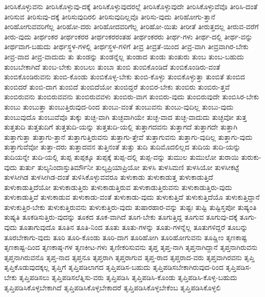 {ತೀರಿಸಿಕೊಳ್ಳುವನು
ತೀರಿಸಿಕೊಳ್ಳುವು-ದಕ್ಕೆ
ತೀರಿಸಿಕೊಳ್ಳುವುದರಲ್ಲೆ
ತೀರಿಸಿಕೊಳ್ಳುವುದೇ
ತೀರಿಸಿಕೊಳ್ಳುವೆವೊ
ತೀರಿಸಿ-ದಂತೆ
ತೀರಿಸುವ
ತೀರಿಸುವು-ದಕ್ಕೆ
ತೀರಿಸುವುದಿರಲಿ
ತೀರಿಸುವುದಿಲ್ಲವೊ
ತೀರಿಸು-ವುದು
ತೀರಿಹೋಗು-ತ್ತಾನೆ
ತೀರಿಹೋಗುವವರಿಗೆಲ್ಲ
ತೀರಿಹೋ-ದರು
ತೀರಿಹೋದವರಿಗೆಲ್ಲ
ತೀರಿಹೋ-ಯಿತು
ತೀರೀತೆ
ತೀರುತ್ತದಲ್ಲ
ತೀರುವ-ವರೆಗೆ
ತೀರು-ವುದು
ತೀರ್ಥಂಕರ
ತೀರ್ಥಂಕರರ
ತೀರ್ಥಂಕರರಂತಹ
ತೀರ್ಥಂಕರರು
ತೀರ್ಥ-ಗಳು
ತೀರ್ಥ-ದಲ್ಲಿ
ತೀರ್ಥ-ವನ್ನು
ತೀರ್ಥವಾಗ-ಬಹುದು
ತೀರ್ಥಸ್ಥಳ-ಗಳಲ್ಲಿ
ತೀರ್ಥಸ್ಥಳ-ಗಳಿಗೆ
ತೀವ್ರ
ತೀವ್ರತೆ-ಯಿಂದ
ತೀವ್ರ-ವಾಗಿ
ತೀವ್ರವಾಗಿರ-ಬೇಕು
ತೀವ್ರ-ವಾದ
ತೀವ್ರ-ವಾದುದು
ತು
ತುಂಡನ್ನು
ತುಂಡನ್ನೆಲ್ಲ
ತುಂಡಾದ
ತುಂಡು
ತುಂತುರು
ತುಂಬ
ತುಂಬ-ಬಹುದು
ತುಂಬಬೇಕಾಗಿದೆ
ತುಂಬ-ಬೇಕು
ತುಂಬಲು
ತುಂಬಾ
ತುಂಬಿ
ತುಂಬಿಕೊಂಡಿದೆ
ತುಂಬಿಕೊಂಡಿರು-ವಂತೆ
ತುಂಬಿಕೊಂಡಿರುವನು
ತುಂಬಿ-ಕೊಂಡು
ತುಂಬಿಕೊಳ್ಳ-ಬೇಕು
ತುಂಬಿ-ಕೊಳ್ಳು
ತುಂಬಿಕೊಳ್ಳುತ್ತಾ
ತುಂಬಿತೆ
ತುಂಬಿದ
ತುಂಬಿದರೆ
ತುಂಬಿ-ದಾಗ
ತುಂಬಿದೆ
ತುಂಬಿದೆಯೋ
ತುಂಬಿದ್ದರೆ
ತುಂಬಿರ-ಬೇಕು
ತುಂಬಿರು
ತುಂಬಿರು-ತ್ತವೆ
ತುಂಬಿರುವನು
ತುಂಬಿರುವವನು
ತುಂಬಿರುವವಳು
ತುಂಬಿರು-ವಾಗ
ತುಂಬಿರು-ವುದು
ತುಂಬಿರುವುದೇ
ತುಂಬಿಸಿರ-ಬೇಕು
ತುಂಬು
ತುಂಬುತ್ತಾ
ತುಂಬುತ್ತಿರುವುದ-ರಿಂದ
ತುಂಬು-ವಂತೆ
ತುಂಬುವನು
ತುಂಬು-ವುದಿಲ್ಲ
ತುಂಬು-ವುದು
ತುಂಬುವುದೊ
ತುಂಬುವೆವೊ
ತುಕ್ಕು
ತುಚ್ಛ-ವಾಗಿ
ತುಚ್ಛವಾಗಿಯೇ
ತುಚ್ಛ-ವಾದ
ತುಚ್ಛ-ವಾದುದು
ತುಚ್ಛವೋ
ತುತ್ತ
ತುತ್ತತುದಿ
ತುತ್ತತುದಿಗೆ
ತುತ್ತತುದಿ-ಯನ್ನು
ತುತ್ತತುದಿ-ಯಲ್ಲಿ
ತುತ್ತಾಗದವನು
ತುತ್ತಾಗದೆ
ತುತ್ತಾಗದೇ
ತುತ್ತಾಗಿ
ತುತ್ತಾಗುತ್ತಾ
ತುತ್ತಾಗು-ತ್ತಾನೆ
ತುತ್ತಾಗುತ್ತಿರುವನು
ತುತ್ತಾಗು-ತ್ತೇವೆ
ತುತ್ತಾಗುವನು
ತುತ್ತಾಗು-ವುದಿಲ್ಲ
ತುತ್ತಾಗು-ವುದು
ತುತ್ತಾಗುವೆವೋ
ತುತ್ತಾ-ದರು
ತುತ್ತಾದವನ
ತುತ್ತಿನಂತೆ
ತುತ್ತು
ತುದಿ
ತುದಿಮೊದಲಿಲ್ಲದ
ತುದಿಯ
ತುದಿ-ಯನ್ನು
ತುದಿಯನ್ನೇ
ತುದಿ-ಯಲ್ಲಿ
ತುಪ್ಪ
ತುಪ್ಪಕ್ಕೂ
ತುಪ್ಪಕ್ಕೆ
ತುಪ್ಪ-ದಲ್ಲಿ
ತುಪ್ಪ-ವನ್ನು
ತುಮುಲ
ತುಮುಲೋ
ತುರಾಯಿ
ತುರುಕು-ವುದು
ತುರ್ತು
ತುಲ್ಯನಿಂದಾಸ್ತುತಿರ್ಮೌನೀ
ತುಲ್ಯಪ್ರಿಯಾಪ್ರಿಯೋ
ತುಳಸಿ
ತುಳಸಿಮಣಿ
ತುಳಸಿಯೋ
ತುಳಸೀಕಟ್ಟೆ
ತುಳಸೀಗಿಡ
ತುಳಸೀಗಿಡ-ದಂತೆ
ತುಳಿಸಿಕೊಳ್ಳುವವರೂ
ತುಳುಕಾಡು
ತುಳುಕಾಡುತ್ತ
ತುಳುಕಾಡುತ್ತಿದೆ
ತುಳುಕಾಡುತ್ತಿದೆಯೋ
ತುಳುಕಾಡುತ್ತಿರು
ತುಳುಕಾಡುತ್ತಿರುವ
ತುಳುಕಾಡುತ್ತಿರುವನು
ತುಳುಕಾಡುತ್ತಿರು-ವುದು
ತುಳುಕಾಡುತ್ತಿವೆ
ತುಳುಕಾಡುವ
ತುಳುಕಾಡು-ವಂತೆ
ತುಳುಕಾಡು-ವುದು
ತುಳುಕುತ್ತಿದೆ
ತುಳುಕುತ್ತಿದೆಯೊ
ತುಳುಕುತ್ತಿದ್ದಾನೆ
ತುಳುಕುತ್ತಿರ-ಬೇಕು
ತುಳುಕುತ್ತಿರುವನು
ತುಳುಕುತ್ತಿರು-ವುದು
ತುಷಾರಹಾರ-ವನ್ನು
ತುಷ್ಟಃ
ತುಷ್ಟಿ
ತುಷ್ಟಿಸ್ತಪೋ
ತುಷ್ಯಂತಿ
ತುಷ್ಯತಿ
ತೂಕಡಿಸುತ್ತಿರು-ವುದನ್ನು
ತೂಕದ
ತೂಕ-ವಾಗಿದೆ
ತೂಗ-ಬೇಕು
ತೂಗುತ್ತಿದ್ದ
ತೂಗುವ
ತೂಗುವು-ದಕ್ಕೆ
ತೂಗು-ವುದು
ತೂತಾಗುವುದೊ
ತೂತಿನ
ತೂತಿ-ನಿಂದ
ತೂತು
ತೂತು-ಗಳನ್ನು
ತೂತು-ಗಳನ್ನೆಲ್ಲ
ತೂತುಗಳಿದ್ದರೆ
ತೂಬನ್ನು
ತೂರಬೇಕಾಗು-ವುದು
ತೂರಿ
ತೂರಿ-ಕೊಂಡು
ತೂರಿ-ದಾಗ
ತೂರಿಹೋಗಿ
ತೂರಿಹೋಗುವನು
ತೂಷ್ಣೀಂ
ತೃಣಕಾಷ್ಟ
ತೃಣಕಾಷ್ಟ-ದಿಂದ
ತೃಣಕಾಷ್ಠ-ಗಳ
ತೃಣಕೀಟ-ಗಳು
ತೃಣೀಕರಿಸುವನು
ತೃಪ್ತ
ತೃಪ್ತ-ನಾಗಿ
ತೃಪ್ತನಾಗಿದ್ದಾನೆ
ತೃಪ್ತನಾಗಿರುವನು
ತೃಪ್ತನಾಗಿರುವನೊ
ತೃಪ್ತ-ನಾದ
ತೃಪ್ತನೂ
ತೃಪ್ತರಾಗಿ
ತೃಪ್ತರಾಗುವ
ತೃಪ್ತ-ರಾದ
ತೃಪ್ತರಾದ-ವರು
ತೃಪ್ತವಾಗಿರವನು
ತೃಪ್ತಿ
ತೃಪ್ತಿಕೊಡುವುದಕ್ಕಲ್ಲ
ತೃಪ್ತಿಗೆ
ತೃಪ್ತಿಪಡಿಲಾಗದ
ತೃಪ್ತಿಪಡಿಸ-ಬಹುದು
ತೃಪ್ತಿಪಡಿಸಬೇಕಾಗಿರುವುದ-ರಿಂದ
ತೃಪ್ತಿಪಡಿಸ-ಬೇಕು
ತೃಪ್ತಿಪಡಿಸಲು
ತೃಪ್ತಿಪಡಿಸಲೆತ್ನಿಸು-ವರು
ತೃಪ್ತಿಪಡಿಸಿ
ತೃಪ್ತಿಪಡಿಸಿ-ಕೊಂಡು
ತೃಪ್ತಿಪಡಿಸಿ-ಕೊಳ್ಳ-ಬಹುದು
ತೃಪ್ತಿಪಡಿಸಿಕೊಳ್ಳಬೇಕಾಗಿದೆ
ತೃಪ್ತಿಪಡಿಸಿಕೊಳ್ಳಬೇಕಾದರೆ
ತೃಪ್ತಿಪಡಿಸಿಕೊಳ್ಳಬೇಕೆಂಬ
ತೃಪ್ತಿಪಡಿಸಿಕೊಳ್ಳಲಿ
}
